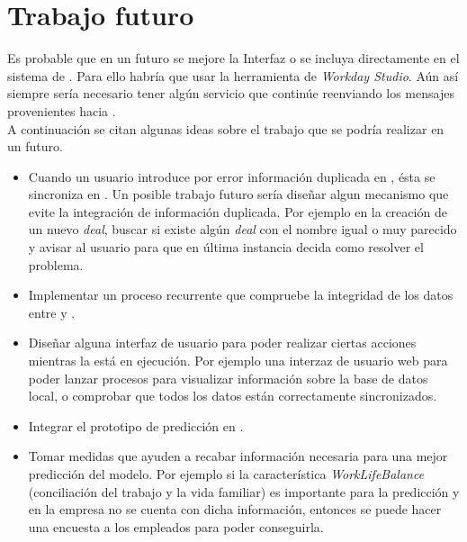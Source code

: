 \chapter{Trabajo futuro}


Es probable que en un futuro se mejore la Interfaz o se incluya directamente en el sistema de \wday{}.
Para ello habría que usar la herramienta de \textit{Workday Studio}.
Aún así siempre sería necesario tener algún servicio que continúe reenviando los mensajes provenientes \hs{} hacia \wday{}. \\

A continuación se citan algunas ideas sobre el trabajo que se podría realizar en un futuro.
\begin{itemize}
	\item Cuando un usuario introduce por error información duplicada en \hs{}, ésta se sincroniza en \wday{}. 
	Un posible trabajo futuro sería diseñar algun mecanismo que evite la integración de información duplicada. 
	Por ejemplo en la creación de un nuevo \textit{deal}, buscar si existe algún \textit{deal} con el nombre igual o muy parecido y avisar al usuario para que en última instancia decida como resolver el problema.
	
	\item Implementar un proceso recurrente que compruebe la integridad de los datos entre \hs{} y \wday{}.
	
	\item Diseñar alguna interfaz de usuario para poder realizar ciertas acciones mientras la \iface{} está en ejecución. Por ejemplo una interzaz de usuario web para poder lanzar procesos para visualizar información sobre la base de datos local, o comprobar que todos los datos están correctamente sincronizados.
	
	\item Integrar el prototipo de predicción en \wday{}.
	
	\item Tomar medidas que ayuden a recabar información necesaria para una mejor predicción del modelo. 
	Por ejemplo si la característica \textit{WorkLifeBalance} (conciliación del trabajo y la vida familiar) es importante para la predicción y en la empresa no se cuenta con dicha información, entonces se puede hacer una encuesta a los empleados para poder conseguirla.

\end{itemize}



